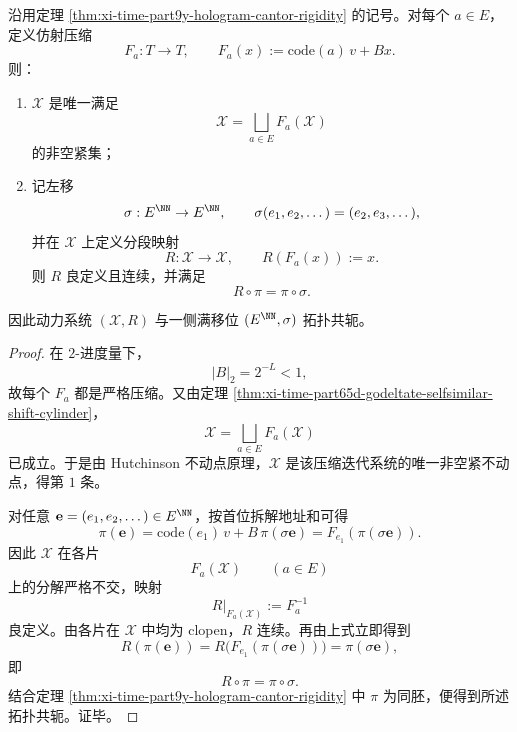 \begin{theorem}[全息地址动力学与一侧满移位的共轭]\label{thm:xi-time-part9y-hologram-full-shift-conjugacy}
沿用定理 \ref{thm:xi-time-part9y-hologram-cantor-rigidity} 的记号。对每个 \(a\in E\)，定义仿射压缩
\[
F_a:T\longrightarrow T,
\qquad
F_a(x):=\mathrm{code}(a)\,v+Bx.
\]
则：
\begin{enumerate}
  \item \(\mathcal X\) 是唯一满足
  \[
  \mathcal X=\bigsqcup_{a\in E}F_a(\mathcal X)
  \]
  的非空紧集；
  \item 记左移
  \[
  \sigma:E^{\NN}\to E^{\NN},
  \qquad
  \sigma(e_1,e_2,\dots)=(e_2,e_3,\dots),
  \]
  并在 \(\mathcal X\) 上定义分段映射
  \[
  R:\mathcal X\to \mathcal X,
  \qquad
  R(F_a(x)):=x.
  \]
  则 \(R\) 良定义且连续，并满足
  \[
  R\circ \pi=\pi\circ \sigma.
  \]
\end{enumerate}
因此动力系统 \((\mathcal X,R)\) 与一侧满移位 \((E^{\NN},\sigma)\) 拓扑共轭。
\end{theorem}
\begin{proof}
在 \(2\)-进度量下，
\[
|B|_2=2^{-L}<1,
\]
故每个 \(F_a\) 都是严格压缩。又由定理 \ref{thm:xi-time-part65d-godeltate-selfsimilar-shift-cylinder}，
\[
\mathcal X=\bigsqcup_{a\in E}F_a(\mathcal X)
\]
已成立。于是由 Hutchinson 不动点原理，\(\mathcal X\) 是该压缩迭代系统的唯一非空紧不动点，得第 \(1\) 条。

对任意 \(\mathbf e=(e_1,e_2,\dots)\in E^{\NN}\)，按首位拆解地址和可得
\[
\pi(\mathbf e)=\mathrm{code}(e_1)\,v+B\,\pi(\sigma\mathbf e)=F_{e_1}(\pi(\sigma\mathbf e)).
\]
因此 \(\mathcal X\) 在各片
\[
F_a(\mathcal X)\qquad (a\in E)
\]
上的分解严格不交，映射
\[
R|_{F_a(\mathcal X)}:=F_a^{-1}
\]
良定义。由各片在 \(\mathcal X\) 中均为 clopen，\(R\) 连续。再由上式立即得到
\[
R(\pi(\mathbf e))
=
R\!\bigl(F_{e_1}(\pi(\sigma\mathbf e))\bigr)
=
\pi(\sigma\mathbf e),
\]
即
\[
R\circ \pi=\pi\circ \sigma.
\]
结合定理 \ref{thm:xi-time-part9y-hologram-cantor-rigidity} 中 \(\pi\) 为同胚，便得到所述拓扑共轭。证毕。
\end{proof}

